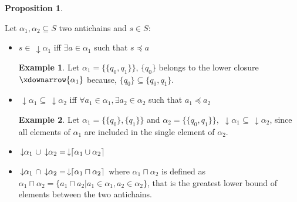 \documentclass[letterpaper]{article}
\DeclarePairedDelimiter{\ceil}{\lceil}{\rceil}
\newcommand{\darrow}{\, \downarrow \!\!}
\theoremstyle{definition}
\newtheorem{proposition}{Proposition}[subsection]
\newtheorem{example}{Example}[subsection]
\begin{document}
\begin{proposition}

\label{antichains_ops}

Let $\alpha_1, \alpha_2 \subseteq S$ two antichains and $s \in S$:

\begin{itemize}
    \item $s \in \darrow \alpha_1$
    iff $\exists a \in \alpha_1$ such that $s \preceq a$

    \begin{example}
        Let $\alpha_1 = \{\{q_0, q_1\}\}$, $\{q_0\}$ belongs to
        the lower closure $\xdownarrow{\alpha_1}$ because,
        $\{q_0\} \subseteq \{q_0, q_1\}$.
    \end{example}

    \item $\darrow \alpha_1 \subseteq \darrow \alpha_2$
    iff $\forall a_1 \in \alpha_1,
    \exists a_2 \in \alpha_2$ such that $a_1 \preceq a_2$
    \begin{example}
    Let $\alpha_1 = \{\{q_0\}, \{q_1\}\}$ and
    $\alpha_2 = \{\{q_0, q_1\}\}$,
    $\darrow{\alpha_1} \subseteq \darrow{\alpha_2}$, since
    all elements of $\alpha_1$ are included
    in the single element of $\alpha_2$.
    \end{example}
    \item $ \darrow \alpha_1 \ \cup \darrow \alpha_2 =
    \darrow \ceil{\alpha_1 \cup \alpha_2}$

    \item $\darrow \alpha_1 \ \cap \darrow \alpha_2 =
    \darrow \ceil{\alpha_1 \sqcap \alpha_2}$ where $\alpha_1 \sqcap \alpha_2$
    is defined as
    $\alpha_1 \sqcap \alpha_2 = \{a_1 \sqcap a_2 | a_1
    \in \alpha_1, a_2 \in \alpha_2\}$, that is the greatest lower bound
    of elements between the two antichains.

\end{itemize}

\end{proposition}



%
%
\end{document}
